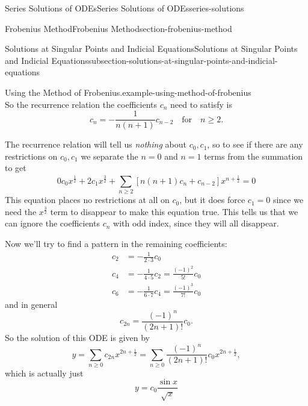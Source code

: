 \documentclass[oneside,10pt,]{book}
\numberwithin{equation}{section}
\newcommand{\amp}{&}
\begin{document}
\begin{chapterptx}{Series Solutions of ODEs}{}{Series Solutions of ODEs}{}{}{series-solutions}
\begin{sectionptx}{Frobenius Method}{}{Frobenius Method}{}{}{section-frobenius-method}
\begin{subsectionptx}{Solutions at Singular Points and Indicial Equations}{}{Solutions at Singular Points and Indicial Equations}{}{}{subsection-solutions-at-singular-points-and-indicial-equations}
\begin{example}{Using the Method of Frobenius.}{example-using-method-of-frobenius}
\begin{equation*}
\end{equation*}
So the recurrence relation the coefficients \(c_{n}\) need to satisfy is%
\begin{equation*}
c_{n} = -\frac{1}{n(n+1)}c_{n-2}\quad\text{for}\quad n\geq2.
\end{equation*}
%
\par
\hypertarget{p-484}{}%
The recurrence relation will tell us \emph{nothing} about \(c_{0},c_{1}\), so to see if there are any restrictions on \(c_{0},c_{1}\) we separate the \(n=0\) and \(n=1\) terms from the summation to get%
\begin{equation*}
0c_{0}x^{\frac{1}{2}}+2c_{1}x^{\frac{3}{2}}+\sum_{n\geq2}^{}\left[n(n+1)c_{n}+c_{n-2}\right]x^{n+\frac{1}{2}}=0
\end{equation*}
This equation places no restrictions at all on \(c_{0}\), but it does force \(c_{1} = 0\) since we need the \(x^{\frac{3}{2}}\) term to disappear to make this equation true. This tells us that we can ignore the coefficients \(c_{n}\) with odd index, since they will all disappear.%
\par
\hypertarget{p-485}{}%
Now we'll try to find a pattern in the remaining coefficients:%
\begin{align*}
c_{2} \amp= -\frac{1}{2\cdot3}c_{0}\\
c_{4} \amp= -\frac{1}{4\cdot5}c_{2} = \frac{(-1)^{2}}{5!}c_{0}\\
c_{6} \amp= -\frac{1}{6\cdot7}c_{4} = \frac{(-1)^{3}}{7!}c_{0}
\end{align*}
and in general%
\begin{equation*}
c_{2n} = \frac{(-1)^{n}}{(2n+1)!}c_{0}.
\end{equation*}
So the solution of this ODE is given by%
\begin{equation*}
y = \sum_{n\geq0}c_{2n}x^{2n+\frac{1}{2}} = \sum_{n\geq0}\frac{(-1)^{n}}{(2n+1)!}c_{0}x^{2n+\frac{1}{2}},
\end{equation*}
which is actually just%
\begin{equation*}
y = c_{0}\frac{\sin x}{\sqrt{x}}
\end{equation*}
%
\end{example}
\end{subsectionptx}
\end{sectionptx}
\end{chapterptx}
%
%
\typeout{************************************************}
\typeout{************************************************}
%
\end{document}
